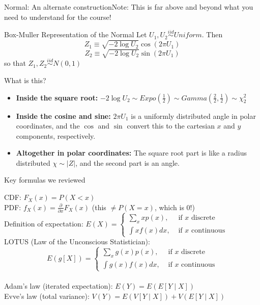 \documentclass{beamer}
\begin{document}
\begin{frame}{Normal: An alternate construction}{Note: This is far above and beyond what you need to understand for the course!}
\begin{block}{Box-Muller Representation of the Normal}
Let $U_1,U_2\stackrel{iid}{\sim}Uniform$. Then
$$Z_1\equiv \sqrt{-2 \log U_2}\cos(2\pi U_1)$$
$$Z_2\equiv \sqrt{-2 \log U_2}\sin(2\pi U_1)$$
so that $Z_1,Z_2\stackrel{iid}{\sim} N(0,1)$
\end{block}
\begin{footnotesize}
What is this?
\begin{itemize}
\item \textbf{Inside the square root:} $-2\log U_2\sim Expo\left(\frac{1}{2}\right)\sim Gamma\left(\frac{2}{2},\frac{1}{2}\right)\sim \chi^2_2$
\item \textbf{Inside the cosine and sine:} $2\pi U_1$ is a uniformly distributed angle in polar coordinates, and the $\cos$ and $\sin$ convert this to the cartesian $x$ and $y$ components, respectively.
\item \textbf{Altogether in polar coordinates:} The square root part is like a radius distributed $\chi\sim |Z|$, and the second part is an angle.
\end{itemize}
\end{footnotesize}
\end{frame}

\begin{frame}{Key formulas we reviewed}
\begin{footnotesize}
CDF: $F_X(x)=P(X<x)$ \\
\medskip
PDF: $f_X(x)=\frac{\partial}{\partial x}F_X(x)$ (this $\neq P(X=x)$, which is 0!) \\
\medskip
Definition of expectation: $E(X)=\begin{cases}\sum_x xp(x),& \text{ if }x\text{ discrete} \\
\int x f(x) dx,&\text{ if }x\text{ continuous}\end{cases}$ \\
\medskip
LOTUS (Law of the Unconscious Statistician):
$$E(g[X])=\begin{cases}\sum_x g(x)p(x),& \text{ if }x\text{ discrete} \\
\int g(x) f(x) dx,&\text{ if }x\text{ continuous}\end{cases}$$ \\
\medskip
Adam's law (iterated expectation): $E(Y)=E(E[Y\mid X])$ \\
\medskip
Evve's law (total variance): $V(Y)=E(V[Y\mid X])+V(E[Y\mid X])$
\end{footnotesize}
\end{frame}
\end{document}
